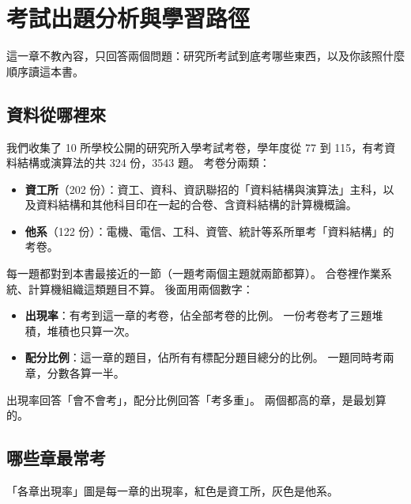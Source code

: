 \chapter*{考試出題分析與學習路徑}

這一章不教內容，只回答兩個問題：研究所考試到底考哪些東西，以及你該照什麼順序讀這本書。

\section*{資料從哪裡來}

我們收集了 10 所學校公開的研究所入學考試考卷，學年度從 77 到 115，有考資料結構或演算法的共 324 份，3543 題。 考卷分兩類：

\begin{itemize}
\item \textbf{資工所}（202 份）：資工、資科、資訊聯招的「資料結構與演算法」主科，以及資料結構和其他科目印在一起的合卷、含資料結構的計算機概論。
\item \textbf{他系}（122 份）：電機、電信、工科、資管、統計等系所單考「資料結構」的考卷。
\end{itemize}

每一題都對到本書最接近的一節（一題考兩個主題就兩節都算）。 合卷裡作業系統、計算機組織這類題目不算。 後面用兩個數字：

\begin{itemize}
\item \textbf{出現率}：有考到這一章的考卷，佔全部考卷的比例。 一份考卷考了三題堆積，堆積也只算一次。
\item \textbf{配分比例}：這一章的題目，佔所有有標配分題目總分的比例。 一題同時考兩章，分數各算一半。
\end{itemize}

出現率回答「會不會考」，配分比例回答「考多重」。 兩個都高的章，是最划算的。

\section*{哪些章最常考}

「各章出現率」圖是每一章的出現率，紅色是資工所，灰色是他系。

